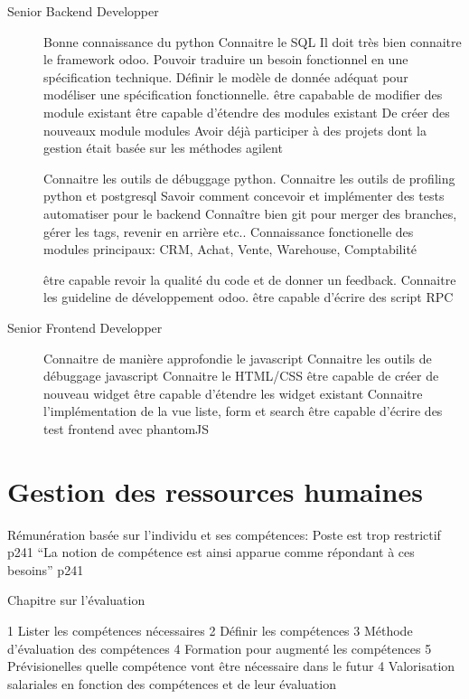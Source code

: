 \begin{description}
  \item[Senior Backend Developper] 
  Bonne connaissance du python
  Connaitre le SQL
  Il doit très bien connaitre le framework odoo. 
  Pouvoir traduire un besoin fonctionnel en une spécification technique.
  Définir le modèle de donnée adéquat pour modéliser une spécification fonctionnelle.
  être capabable de modifier des module existant
  être capable d'étendre des modules existant
  De créer des nouveaux module modules
  Avoir déjà participer à des projets dont la gestion était basée sur les méthodes agilent

  Connaitre les outils de débuggage python.
  Connaitre les outils de profiling python et postgresql
  Savoir comment concevoir et implémenter des tests automatiser pour le backend 
  Connaître bien git pour merger des branches, gérer les tags, revenir en arrière etc..
  Connaissance fonctionelle des modules principaux: CRM, Achat, Vente, Warehouse, Comptabilité
  
  être capable revoir la qualité du code et de donner un feedback.
  Connaitre les guideline de développement odoo. 
  être capable d'écrire des script RPC
  
  \item[Senior Frontend Developper] 
  Connaitre de manière approfondie le javascript
  Connaitre les outils de débuggage javascript
  Connaitre le HTML/CSS 
  être capable de créer de nouveau widget
  être capable d'étendre les widget existant
  Connaitre l'implémentation de la vue liste, form et search
  être capable d'écrire des test frontend avec phantomJS
  
\end{description}








\section{Gestion des ressources humaines} \cite{gestionressourceshumaine2007}


Rémunération basée sur l'individu et ses compétences: Poste est trop restrictif p241
``La notion de compétence est ainsi apparue comme répondant à ces besoins'' p241




Chapitre sur l'évaluation



1 Lister les compétences nécessaires
2 Définir les compétences 
3 Méthode d'évaluation des compétences
4 Formation pour augmenté les compétences
5 Prévisionelles quelle compétence vont être nécessaire dans le futur
4 Valorisation salariales en fonction des compétences et de leur évaluation

